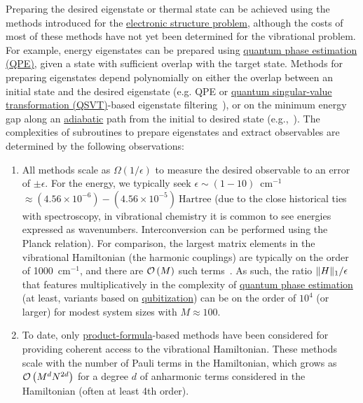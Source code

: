 \begin{refsection}
Preparing the desired eigenstate or thermal state can be achieved using the methods introduced for the \hyperref[appl:ElectronicStructure]{electronic structure problem}, although the costs of most of these methods have not yet been determined for the vibrational problem. For example, energy eigenstates can be prepared using \hyperref[prim:QPE]{quantum phase estimation (QPE)}, given a state with sufficient overlap with the target state. Methods for preparing eigenstates depend polynomially on either the overlap between an initial state and the desired eigenstate (e.g. QPE or \hyperref[prim:QSVT]{quantum singular-value transformation (QSVT)}-based eigenstate filtering~\cite{lin2020NearOptimalGroundState}), or on the minimum energy gap along an \hyperref[prim:QuantumAdiabaticAlgorithm]{adiabatic} path from the initial to desired state (e.g.,~\cite{wan2020FastDigitalMethodsForAdiabatic}). The complexities of subroutines to prepare eigenstates and extract observables are determined by the following observations:
\begin{enumerate}
    \item All methods scale as $\Omega(1/\epsilon)$ to measure the desired observable to an error of $\pm \epsilon$. For the energy, we typically seek $\epsilon \sim (1 - 10)$~cm$^{-1}$~$\approx (4.56 \times 10^{-6}) - (4.56 \times 10^{-5})~\mathrm{Hartree}$ (due to the close historical ties with spectroscopy, in vibrational chemistry it is common to see energies expressed as wavenumbers. Interconversion can be performed using the Planck relation). For comparison, the largest matrix elements in the vibrational Hamiltonian (the harmonic couplings) are typically on the order of 1000~cm$^{-1}$, and there are $\mathcal{O}\left( M \right)$ such terms~\cite{sawaya2021NearLongTermQuantumVibrationalSpectroscopy}. As such, the ratio $\lVert H\rVert_1 / \epsilon$ that features multiplicatively in the complexity of \hyperref[prim:QPE]{quantum phase estimation} (at least, variants based on \hyperref[prim:Qubitization]{qubitization}) can be on the order of $10^4$ (or larger) for modest system sizes with $M \approx 100$.
    \item To date, only \hyperref[prim:ProductFormulae]{product-formula}-based methods have been considered for providing coherent access to the vibrational Hamiltonian. These methods scale with the number of Pauli terms in the Hamiltonian, which grows as $\mathcal{O}\left( M^d N^{2d} \right)$ for a degree $d$ of anharmonic terms considered in the Hamiltonian (often at least 4th order).
\end{enumerate}





\end{refsection}
